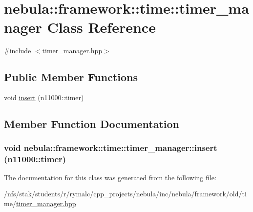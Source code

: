 \hypertarget{classnebula_1_1framework_1_1time_1_1timer__manager}{
\section{nebula::framework::time::timer\_\-manager Class Reference}
\label{classnebula_1_1framework_1_1time_1_1timer__manager}
}


{\ttfamily \#include $<$timer\_\-manager.hpp$>$}\subsection*{Public Member Functions}
\begin{DoxyCompactItemize}
\item 
void \hyperlink{classnebula_1_1framework_1_1time_1_1timer__manager_a3ecadf6b5745b151f94c9d978eddb411}{insert} (n11000::timer)
\end{DoxyCompactItemize}


\subsection{Member Function Documentation}
\hypertarget{classnebula_1_1framework_1_1time_1_1timer__manager_a3ecadf6b5745b151f94c9d978eddb411}{
\subsubsection[{insert}]{\setlength{\rightskip}{0pt plus 5cm}void nebula::framework::time::timer\_\-manager::insert (n11000::timer)}}
\label{classnebula_1_1framework_1_1time_1_1timer__manager_a3ecadf6b5745b151f94c9d978eddb411}


The documentation for this class was generated from the following file:\begin{DoxyCompactItemize}
\item 
/nfs/stak/students/r/rymalc/cpp\_\-projects/nebula/inc/nebula/framework/old/time/\hyperlink{timer__manager_8hpp}{timer\_\-manager.hpp}\end{DoxyCompactItemize}
